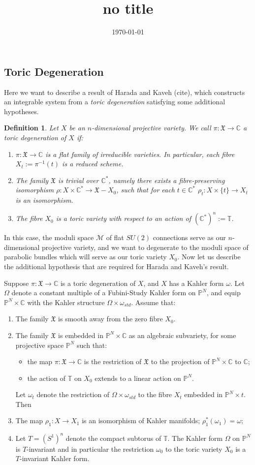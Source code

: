 \documentclass[]{article}
\title{no title}
\date{\today}
\newtheorem{definition}{Definition}
\newcommand{\C}{\mathbb{C}}
\newcommand{\MM}{\mathcal{M}}
\newcommand{\XX}{\mathfrak{X}}
\begin{document}
	
	\subsection{Toric Degeneration}
	Here we want to describe a result of Harada and Kaveh (cite), which constructs an integrable system from a \textit{toric degeneration} satisfying some additional hypotheses. 
	\begin{definition}
		\label{d:toricdegen}
		Let $X$ be an $n$-dimensional projective variety. We call $\pi: \XX\to\C$ a \emph{toric degeneration} of $X$ if:
		\begin{enumerate}
			\item $\pi:\XX\to\C$ is a flat family of irreducible varieties. In particular, each fibre $X_t := \pi^{-1}(t)$ is a reduced scheme.
			\item The family $\XX$ is trivial over $\C^\ast$, namely there exists a fibre-preserving isomorphism $\rho:X\times\C^\ast \to \XX - X_0$, such that for each $t\in \C^\ast$ $\rho_t:X\times\{t\} \to X_t$ is an isomorphism.
			\item The fibre $X_0$ is a toric variety with respect to an action of $(\C^\ast)^n := \mathbb{T}$.
		\end{enumerate}
	\end{definition}
	In this case, the moduli space $\MM$ of flat $SU(2)$ connections serve as our $n$-dimensional projective variety, and we want to degenerate to the moduli space of parabolic bundles which will serve as our toric variety $X_0$. Now let us describe the additional hypothesis that are required for Harada and Kaveh's result.
	
	Suppose $\pi:\XX\to\C$ is a toric degeneration of $X$, and $X$ has a Kahler form $\omega$. Let $\Omega$ denote a constant multiple of a Fubini-Study Kahler form on $\mathbb{P}^N$, and equip $\mathbb{P}^N\times\C$ with the Kahler structure $\Omega \times \omega_{std}$. Assume that:
	\begin{enumerate}
		\item The family $\XX$ is smooth away from the zero fibre $X_0$.
		\item The family $\XX$ is embedded in $\mathbb{P}^N\times \C$ as an algebraic subvariety, for some projective space $\mathbb{P}^N$ such that:
			\begin{itemize}
				\item the map $\pi:\XX\to\C$ is the restriction of $\XX$ to the projection of $\mathbb{P}^N\times \C$ to $\C$;
				\item the action of $\mathbb{T}$ on $X_0$ extends to a linear action on $\mathbb{P}^N$.
			\end{itemize}
		Let $\omega_t$ denote the restriction of $\Omega\times \omega_{std}$ to the fibre $X_t$ embedded in $\mathbb{P}^N \times {t}$. Then
		\item The map $\rho_1 : X\to X_1$ is an isomorphism of Kahler manifolds; $\rho_1^\ast(\omega_1) = \omega$;
		\item Let $T = (S^1)^n$ denote the compact subtorus of $\mathbb{T}$. The Kahler form $\Omega$ on $\mathbb{P}^N$ is $T$-invariant and in particular the restriction $\omega_0$ to the toric variety $X_0$ is a $T$-invariant Kahler form.
	\end{enumerate}
\end{document}
